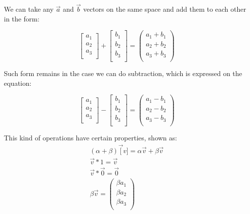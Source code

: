 \documentclass[11pt,fleqn]{book} %
\begin{document}
We can take any $ \vec{a} $ and $ \vec{b} $ vectors on the same space and add them to each other
in the form:

\begin{equation}
    \begin{bmatrix}
        a_1 \\
        a_2 \\
        a_3 \\
    \end{bmatrix}
    +
    \begin{bmatrix}
        b_1 \\
        b_2 \\
        b_3 \\
    \end{bmatrix}
    = 
    \begin{pmatrix}
        a_1 + b_1\\
        a_2 + b_2\\
        a_3 + b_3\\
    \end{pmatrix}
\end{equation}

Such form remains in the case we can do subtraction, which is expressed on the equation:

\begin{equation}
    \begin{bmatrix}
        a_1 \\
        a_2 \\
        a_3 \\
    \end{bmatrix}
    -
    \begin{bmatrix}
        b_1 \\
        b_2 \\
        b_3 \\
    \end{bmatrix}
    = 
    \begin{pmatrix}
        a_1 - b_1\\
        a_2 - b_2\\
        a_3 - b_3\\
    \end{pmatrix}
\end{equation}

This kind of operations have certain properties, shown as:
\begin{gather}
    (\alpha + \beta)\vec[v] = \alpha\vec{v} + \beta\vec{v} \\
    \vec{v} * 1 = \vec{v} \\
    \vec{v} * \vec{0} = \vec{0} \\
    \beta \vec{v} = 
    \begin{pmatrix}
        \beta a_1\\
        \beta a_2\\
        \beta a_3\\
    \end{pmatrix}
\end{gather}
\end{document}
